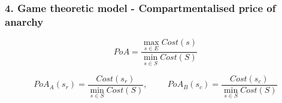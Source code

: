 \begin{frame}
    \frametitle{4. Game theoretic model - Compartmentalised price of anarchy}

    \begin{equation*}
        PoA = \frac{\max_{s \in E} Cost(s)}{\min_{s \in S} Cost(S)}
    \end{equation*}

    \footnotesize
    \vspace{1cm}
    \begin{equation*}
        PoA_A(s_r) = \frac{Cost(s_r)}{\min_{s \in S} Cost(S)}, \hspace{1cm}
        PoA_B(s_c) = \frac{Cost(s_c)}{\min_{s \in S} Cost(S)}
    \end{equation*}
\end{frame}
